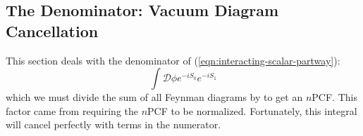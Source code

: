


   







\subsection{The Denominator: Vacuum Diagram Cancellation}
This section deals with the denominator of (\ref{eqn:interacting-scalar-partway}):
$$\int \mathcal{D}\phi e^{-i S_0}e^{-iS_1}$$
which we must divide the sum of all Feynman diagrams by to get an $n$PCF. This factor came from requiring the $n$PCF to be normalized. Fortunately, this integral will cancel perfectly with terms in the numerator.

